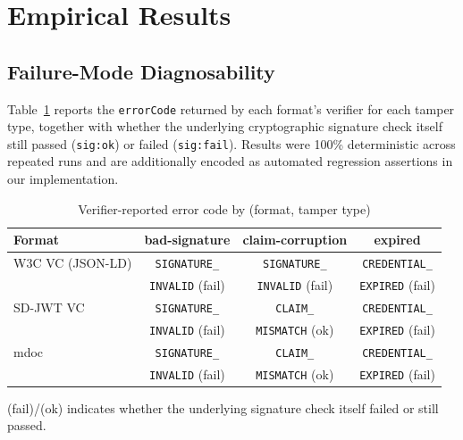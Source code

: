 \documentclass[conference]{IEEEtran}
\begin{document}
\section{Empirical Results}
\label{sec:results}

\subsection{Failure-Mode Diagnosability}

Table~\ref{tab:diagnosability} reports the \texttt{errorCode} returned by each format's verifier for each tamper type, together with whether the underlying cryptographic signature check itself still passed (\texttt{sig:ok}) or failed (\texttt{sig:fail}). Results were 100\% deterministic across repeated runs and are additionally encoded as automated regression assertions in our implementation.

\begin{table}[htbp]
\caption{Verifier-reported error code by (format, tamper type)}
\label{tab:diagnosability}
\centering
\begin{tabular}{@{}lccc@{}}
\toprule
Format & bad-signature & claim-corruption & expired \\
\midrule
W3C VC (JSON-LD) & \texttt{SIGNATURE\_} & \texttt{SIGNATURE\_} & \texttt{CREDENTIAL\_} \\
 & \texttt{INVALID} (fail) & \texttt{INVALID} (fail) & \texttt{EXPIRED} (fail) \\
\addlinespace
SD-JWT VC & \texttt{SIGNATURE\_} & \texttt{CLAIM\_} & \texttt{CREDENTIAL\_} \\
 & \texttt{INVALID} (fail) & \texttt{MISMATCH} (ok) & \texttt{EXPIRED} (fail) \\
\addlinespace
mdoc & \texttt{SIGNATURE\_} & \texttt{CLAIM\_} & \texttt{CREDENTIAL\_} \\
 & \texttt{INVALID} (fail) & \texttt{MISMATCH} (ok) & \texttt{EXPIRED} (fail) \\
\bottomrule
\end{tabular}
\vspace{2pt}
\raggedright\footnotesize (fail)/(ok) indicates whether the underlying signature check itself failed or still passed.
\end{table}
\end{document}

